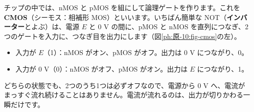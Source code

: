\label{ph:原-10:sec7}
チップの中では、nMOS と pMOS を組にして論理ゲートを作ります。これを \textbf{CMOS}（シーモス：相補形 MOS）といいます。いちばん簡単な NOT（\textbf{インバーター}とよぶ）は、電源 $E$ と 0 V の間に、pMOS と nMOS を直列につなぎ、2つのゲートを入力に、つなぎ目を出力にします（図\ref{ph:原-10:fig-cmos}の左）。
\begin{itemize}[label={\color{bkTheme}●}, leftmargin=1.6\zw, itemsep=1pt, topsep=2pt]
\item 入力が $E$（1）：nMOS がオン、pMOS がオフ。出力は 0 V につながり、0。
\item 入力が 0 V（0）：nMOS がオフ、pMOS がオン。出力は $E$ につながり、1。
\end{itemize}
どちらの状態でも、2つのうち1つは必ずオフなので、電源から 0 V へ、電流がまっすぐ流れ続けることはありません。電流が流れるのは、出力が切りかわる一瞬だけです。

